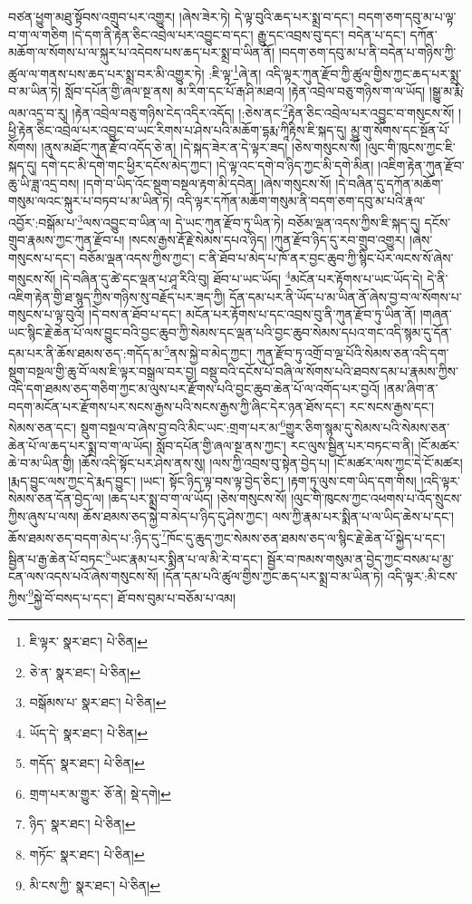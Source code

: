 བཙན་ཕྱུག་མཐུ་སྟོབས་འགྲུབ་པར་འགྱུར། །ཞེས་ཟེར་ཏེ། དེ་ལྟ་བུའི་ཆད་པར་སྨྲ་བ་དང་། བདག་ཅག་དབུ་མ་པ་ལྟ་བ་ག་ལ་གཅིག །དེ་དག་ནི་རྟེན་ཅིང་འབྲེལ་པར་འབྱུང་བ་དང་། རྒྱུ་དང་འབྲས་བུ་དང་། བདེན་པ་དང་། དཀོན་མཆོག་ལ་སོགས་པ་ལ་སྐུར་པ་འདེབས་པས་ཆད་པར་སྨྲ་བ་ཡིན་ནོ། །བདག་ཅག་དབུ་མ་པ་ནི་བདེན་པ་གཉིས་ཀྱི་ཚུལ་ལ་གནས་པས་ཆད་པར་སྨྲ་བར་མི་འགྱུར་ཏེ། :ཇི་ལྟ་\footnote{ཇི་ལྟར་  སྣར་ཐང་།  པེ་ཅིན། }ཞེ་ན། འདི་ལྟར་ཀུན་རྫོབ་ཀྱི་ཚུལ་གྱིས་ཀྱང་ཆད་པར་སྨྲ་བ་མ་ཡིན་ཏེ། སློབ་དཔོན་གྱི་ཞལ་སྔ་ནས། མ་རིག་དང་པོ་རྒ་ཤི་མཐའ། །རྟེན་འབྲེལ་བཅུ་གཉིས་ག་ལ་ཡོད། །སྒྱུ་མ་རྨི་ལམ་འདྲ་བ་རུ། །རྟེན་འབྲེལ་བཅུ་གཉིས་ངེད་འདིར་འདོད། །:ཅེས་ནང་\footnote{ཅེ་ན་  སྣར་ཐང་།  པེ་ཅིན། }རྟེན་ཅིང་འབྲེལ་པར་འབྱུང་བ་གསུངས་སོ། །ཕྱི་རྟེན་ཅིང་འབྲེལ་པར་འབྱུང་བ་ཡང་རིགས་པ་ཤེས་པའི་མཆོག་དྷརྨ་ཀཱིརྟིས་ཇི་སྐད་དུ། མྱུ་གུ་སོགས་དང་སྔོན་པོ་སོགས། །ནུས་མཐོང་ཀུན་རྫོབ་འདོད་ཅེ་ན། །དེ་སྐད་ཟེར་ན་དེ་ལྟར་ཟད། །ཅེས་གསུངས་སོ། །ལུང་གི་ཁུངས་ཀྱང་ཇི་སྐད་དུ། དགེ་དང་མི་དགེ་གང་ཕྱིར་དངོས་མེད་ཀྱང་། །དེ་ལྟ་འང་དགེ་བ་ཉིད་ཀྱང་མི་དགེ་མིན། །འཇིག་རྟེན་ཀུན་རྫོབ་ཆུ་ཡི་ཟླ་འདྲ་བས། །དགེ་བ་ཡིད་འོང་སྡུག་བསྔལ་རྟག་མི་དབེན། །ཞེས་གསུངས་སོ། །དེ་བཞིན་དུ་དཀོན་མཆོག་གསུམ་ལའང་སྐུར་པ་བཏབ་པ་མ་ཡིན་ཏེ། འདི་ལྟར་དཀོན་མཆོག་གསུམ་ནི་བདག་ཅག་དབུ་མ་པའི་རྣལ་འབྱོར་:བསྒོམ་པ་\footnote{བསྒོམས་པ་  སྣར་ཐང་།  པེ་ཅིན། }ལས་འབྱུང་བ་ཡིན་ལ། དེ་ཡང་ཀུན་རྫོབ་ཏུ་ཡིན་ཏེ། བཅོམ་ལྡན་འདས་ཀྱིས་ཇི་སྐད་དུ། དངོས་གྲུབ་རྣམས་ཀྱང་ཀུན་རྫོབ་པ། །སངས་རྒྱས་རྡོ་རྗེ་སེམས་དཔའ་ཉིད། །ཀུན་རྫོབ་ཉིད་དུ་རབ་གྲུབ་འགྱུར། །ཞེས་གསུངས་པ་དང་། བཅོམ་ལྡན་འདས་ཀྱིས་ཀྱང་། ང་ནི་ཐོབ་པ་མེད་པ་ཁོ་ནར་བྱང་ཆུབ་ཀྱི་སྙིང་པོར་ལངས་སོ་ཞེས་གསུངས་སོ། །དེ་བཞིན་དུ་ཚེ་དང་ལྡན་པ་ཤཱ་རིའི་བུ། ཐོབ་པ་ཡང་ཡོད། \footnote{ཡོད་དེ་  སྣར་ཐང་།  པེ་ཅིན། }མངོན་པར་རྟོགས་པ་ཡང་ཡོད་དེ། དེ་ནི་འཇིག་རྟེན་གྱི་ཐ་སྙད་ཀྱིས་གཉིས་སུ་བརྗོད་པར་ཟད་ཀྱི། དོན་དམ་པར་ནི་ཡོད་པ་མ་ཡིན་ནོ་ཞེས་བྱ་བ་ལ་སོགས་པ་གསུངས་པ་ལྟ་བུའོ། །དེ་བས་ན་ཐོབ་པ་དང་། མངོན་པར་རྟོགས་པ་དང་འབྲས་བུ་ནི་ཀུན་རྫོབ་ཏུ་ཡིན་ནོ། །གཞན་ཡང་སྙིང་རྗེ་ཆེན་པོ་ལས་བྱུང་བའི་བྱང་ཆུབ་ཀྱི་སེམས་དང་ལྡན་པའི་བྱང་ཆུབ་སེམས་དཔའ་གང་འདི་སྙམ་དུ་དོན་དམ་པར་ནི་ཆོས་ཐམས་ཅད་:གདོད་མ་\footnote{གདོད་  སྣར་ཐང་།  པེ་ཅིན། }ནས་སྐྱེ་བ་མེད་ཀྱང་། ཀུན་རྫོབ་ཏུ་འགྲོ་བ་ལྔ་པོའི་སེམས་ཅན་འདི་དག་སྡུག་བསྔལ་གྱི་ཆུ་བོ་ལས་ཇི་ལྟར་བསྒྲལ་བར་བྱ། བསྡུ་བའི་དངོས་པོ་བཞི་ལ་སོགས་པའི་ཐབས་དམ་པ་རྣམས་ཀྱིས་འདི་དག་ཐམས་ཅད་གཅིག་ཀྱང་མ་ལུས་པར་རྫོགས་པའི་བྱང་ཆུབ་ཆེན་པོ་ལ་འགོད་པར་བྱའོ། །ནམ་ཞིག་ན་བདག་མངོན་པར་རྫོགས་པར་སངས་རྒྱས་པའི་སངས་རྒྱས་ཀྱི་ཞིང་དེར་ཉན་ཐོས་དང་། རང་སངས་རྒྱས་དང་། སེམས་ཅན་དང་། སྡུག་བསྔལ་བ་ཞེས་བྱ་བའི་མིང་ཡང་:གྲག་པར་མ་\footnote{གྲག་པར་མ་གྱུར་  ཅོ་ནེ།  སྡེ་དགེ། }གྱུར་ཅིག་སྙམ་དུ་སེམས་པའི་སེམས་ཅན་ཆེན་པོ་ལ་ཆད་པར་སྨྲ་བ་ག་ལ་ཡོད། སློབ་དཔོན་གྱི་ཞལ་སྔ་ནས་ཀྱང་། རང་ལུས་སྦྱིན་པར་བཏང་བ་ནི། །ངོ་མཚར་ཆེ་བ་མ་ཡིན་གྱི། །ཆོས་འདི་སྟོང་པར་ཤེས་ནས་སུ། །ལས་ཀྱི་འབྲས་བུ་སྟེན་བྱེད་པ། །ངོ་མཚར་ལས་ཀྱང་དེ་ངོ་མཚར། །རྨད་བྱུང་ལས་ཀྱང་དེ་རྨད་བྱུང་། །ཡང་། སྟོང་ཉིད་ལྟ་བས་ལྟ་བྱེད་ཅིང་། །རྟག་ཏུ་ལུས་ངག་ཡིད་དག་གིས། །འདི་ལྟར་སེམས་ཅན་དོན་བྱེད་ལ། །ཆད་པར་སྨྲ་བ་ག་ལ་ཡོད། །ཅེས་གསུངས་སོ། །ལུང་གི་ཁུངས་ཀྱང་འཕགས་པ་འོད་སྲུངས་ཀྱིས་ཞུས་པ་ལས། ཆོས་ཐམས་ཅད་སྐྱེ་བ་མེད་པ་ཉིད་དུ་ཤེས་ཀྱང་། ལས་ཀྱི་རྣམ་པར་སྨིན་པ་ལ་ཡིད་ཆེས་པ་དང་། ཆོས་ཐམས་ཅད་བདག་མེད་པ་:ཉིད་དུ་\footnote{ཉིད་  སྣར་ཐང་།  པེ་ཅིན། }ཁོང་དུ་ཆུད་ཀྱང་སེམས་ཅན་ཐམས་ཅད་ལ་སྙིང་རྗེ་ཆེན་པོ་སྐྱེད་པ་དང་། སྦྱིན་པ་རྒྱ་ཆེན་པོ་བཏང་\footnote{གཏོང་  སྣར་ཐང་།  པེ་ཅིན། }ཡང་རྣམ་པར་སྨིན་པ་ལ་མི་རེ་བ་དང་། སྦྱོར་བ་ཁམས་གསུམ་ན་བྱེད་ཀྱང་བསམ་པ་མྱ་ངན་ལས་འདས་པའོ་ཞེས་གསུངས་སོ། །དོན་དམ་པའི་ཚུལ་གྱིས་ཀྱང་ཆད་པར་སྨྲ་བ་མ་ཡིན་ཏེ། འདི་ལྟར་:མི་ངས་ཀྱིས་\footnote{མི་ངས་ཀྱི་  སྣར་ཐང་།  པེ་ཅིན། }སྐྱེ་བོ་བསད་པ་དང་། ཐོ་བས་བུམ་པ་བཅོམ་པ་འམ། 